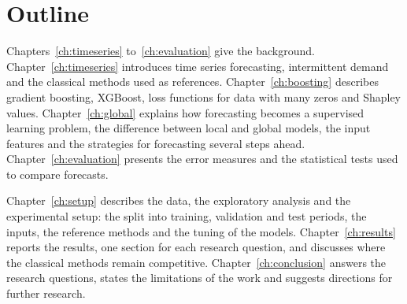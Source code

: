 \section{Outline}
\label{sec:outline}

Chapters~\ref{ch:timeseries} to~\ref{ch:evaluation} give the background. Chapter~\ref{ch:timeseries}
introduces time series forecasting, intermittent demand and the classical methods used as references.
Chapter~\ref{ch:boosting} describes gradient boosting, XGBoost, loss functions for data with many zeros and
Shapley values. Chapter~\ref{ch:global} explains how forecasting becomes a supervised learning problem, the
difference between local and global models, the input features and the strategies for forecasting several
steps ahead. Chapter~\ref{ch:evaluation} presents the error measures and the statistical tests used to
compare forecasts.

Chapter~\ref{ch:setup} describes the data, the exploratory analysis and the experimental setup: the split
into training, validation and test periods, the inputs, the reference methods and the tuning of the models.
Chapter~\ref{ch:results} reports the results, one section for each research question, and discusses where
the classical methods remain competitive. Chapter~\ref{ch:conclusion} answers the research questions, states
the limitations of the work and suggests directions for further research.

